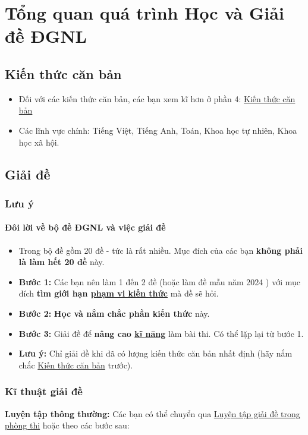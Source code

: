 \section{Tổng quan quá trình Học và Giải đề ĐGNL}
\subsection{Kiến thức căn bản}\label{sec:basic}
\begin{itemize}
    \item Đối với các kiến thức căn bản, các bạn xem kĩ hơn ở phần 4: \hyperref[sec:bigbasic]{Kiến thức căn bản}
    \item Các lĩnh vực chính: Tiếng Việt, Tiếng Anh, Toán, Khoa học tự nhiên, Khoa học xã hội.
\end{itemize}

\subsection{Giải đề}
\subsubsection{Lưu ý}

\paragraph{Đôi lời về bộ đề ĐGNL và việc giải đề}

\begin{itemize}
    \item Trong bộ đề gồm 20 đề - tức là rất nhiều. Mục đích của các bạn \textbf{không phải là làm hết 20 đề} này.
    \item \textbf{Bước 1:} Các bạn nên làm 1 đến 2 đề (hoặc làm đề mẫu năm 2024 \cite{demau2024}) với mục đích \textbf{tìm giới hạn  \hyperref[sec:phamvikienthuc]{phạm vi kiến thức}} mà đề sẽ hỏi. 
    \item \textbf{Bước 2:} \textbf{Học và nắm chắc phần kiến thức} này.
    \item \textbf{Bước 3:} Giải đề để \textbf{nâng cao \hyperref[sec:kinanglambai]{kĩ năng}} làm bài thi. Có thể lặp lại từ bước 1.
    \item \textbf{Lưu ý:} Chỉ giải đề khi đã có lượng kiến thức căn bản nhất định (hãy nắm chắc \hyperref[sec:basic]{Kiến thức căn bản} trước). 
\end{itemize}

\subsubsection{Kĩ thuật giải đề}
\textbf{Luyện tập thông thường:} Các bạn có thể chuyển qua \hyperref[sec:giaidephongthi]{Luyện tập giải đề trong phòng thi} hoặc theo các bước sau:

